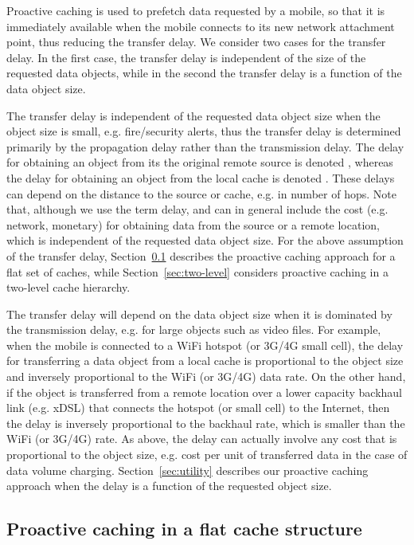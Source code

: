 \documentclass[conference]{IEEEtran}
\begin{document}
Proactive caching is used to prefetch data requested by a mobile, so that it is immediately available when the mobile connects to its new network attachment point, thus reducing the  transfer delay.
We consider two cases for the transfer delay. In the first case, the transfer delay is independent of the size of the requested data objects, while in the second the transfer delay is a function of the data object size.


The transfer delay is independent of the requested data object size when the object size is small, e.g. fire/security alerts, thus the transfer delay is determined primarily by the propagation delay rather than the transmission delay.
The delay for obtaining an object from its the original remote source is  denoted , whereas the delay  for obtaining an object from the local cache is denoted .
These delays  can depend on the distance to the source or cache, e.g. in number of hops.
Note that, although we use the term delay,  and 
can in general include the cost (e.g. network, monetary) for obtaining data from the source or a remote location, which is independent of the requested data object size.
For the above assumption of the transfer delay,
Section~\ref{sec:flat} describes the proactive caching approach for a flat set of caches, while Section~\ref{sec:two-level} considers proactive caching in a two-level cache hierarchy.

The transfer delay will depend on the data object size when it is dominated by the transmission delay, e.g.  for large  objects such as video files. For example, when the mobile is connected to a WiFi hotspot (or 3G/4G small cell), the delay for transferring a data object from a local cache is proportional to the object size and inversely proportional to the  WiFi (or 3G/4G) data rate.
On the other hand, if the  object is transferred from a remote location over a lower capacity  backhaul link (e.g. xDSL) that connects the hotspot (or  small cell) to the Internet, then the delay
is inversely proportional to the backhaul rate, which is smaller than the WiFi (or 3G/4G) rate. As above, the delay can actually involve any cost that is proportional to the object size, e.g. cost per unit of transferred data in the case of data volume charging.
Section~\ref{sec:utility} describes our proactive caching approach when the  delay is a function of the requested object size.


\vspace{-0.10in}
\subsection{Proactive caching in a flat cache structure}
\label{sec:flat}
\vspace{-0.03in}
\end{document}
